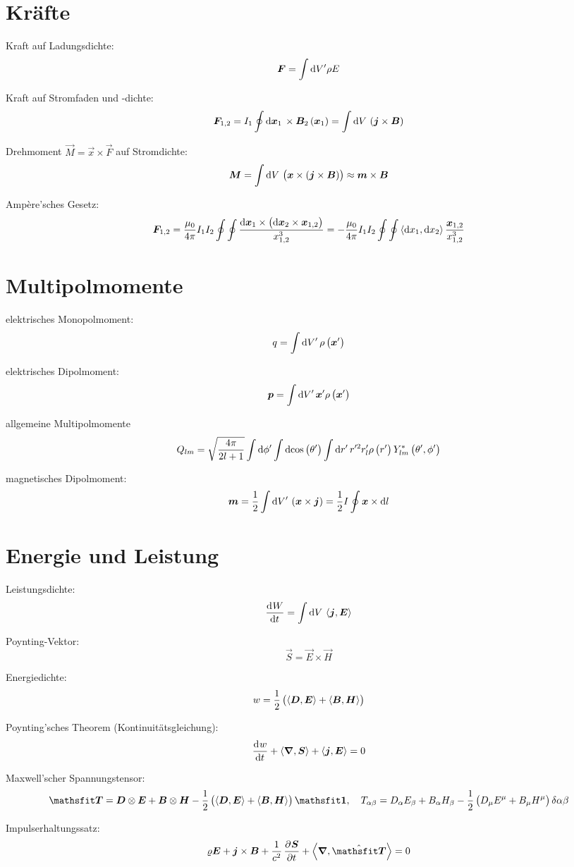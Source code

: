 \section{Kräfte}

Kraft auf Ladungsdichte:
\[
	\vec F
	= \int \dif{V'} \rho E
\]

Kraft auf Stromfaden und -dichte:
\[
	\vec F_{1,2}
	= I_1 \oint \dif{\vec x_1} \, \times \vec B_2\del{\vec x_1}
	= \int \dif{V} \, \del{\vec j \times \vec B}
\]

Drehmoment $\vec M = \vec x \times \vec F$ auf Stromdichte:
\[
	\vec M
	= \int \dif{V} \, \del{\vec x \times \del{\vec j \times \vec B}}
	\approx \vec m \times \vec B
\]

Ampère'sches Gesetz:
\[
	\vec F_{1,2}
	= \frac{\mu_0}{4 \pi} I_1 I_2 \oint \oint \frac{\dif \vec x_1 \times \del{\dif \vec x_2 \times \vec x_{1,2}}}{x_{1,2}^3}
	= - \frac{\mu_0}{4 \pi} I_1 I_2 \oint \oint \inner{\dif x_1}{\dif x_2} \frac{\vec x_{1,2}}{x_{1,2}^3}
\]

\section{Multipolmomente}

elektrisches Monopolmoment:
\[
	q
	= \int \dif{V'} \, \rho\del{\vec x'}
\]

elektrisches Dipolmoment:
\[
	\vec p
	= \int \dif{V'} \, \vec x' \rho\del{\vec x'}
\]

allgemeine Multipolmomente
\[
	Q_{lm}
	=
	\sqrt{\frac{4\pi}{2l+1}}
	\int \dif{\phi'}
	\int \dif{\cos\del{\theta'}}
	\int \dif{r'}
	\,
	r'^2 r'_l \rho\del{r'}
	Y^*_{lm} \del{\theta', \phi'}
\]

magnetisches Dipolmoment:
\[
	\vec m
	= \half \int \dif{V'} \, \del{\vec x \times \vec j}
	= \half I \oint \vec x \times \dif l
\]

\section{Energie und Leistung}

Leistungsdichte:
\[
	\dod Wt = \int \dif V \, \inner{\vec j}{\vec E}
\]

Poynting-Vektor:
\[
	\vec S = \vec E \times \vec H
\]

Energiedichte:
\[
	w = \half \del{\inner{\vec D}{\vec E} + \inner{\vec B}{\vec H}}
\]

Poynting'sches Theorem (Kontinuitätsgleichung):
\[
	\dod wt + \divergence{\vec S} + \inner{\vec j}{\vec E} = 0
\]

Maxwell'scher Spannungstensor:
\[
	\tens T
	= \vec D \otimes \vec E + \vec B \otimes \vec H
	- \half \del{\inner{\vec D}{\vec E} + \inner{\vec B}{\vec H}} \tens 1
	\eqnsep
	T_{\alpha\beta}
	= D_\alpha E_\beta + B_\alpha H_\beta - \half \del{D_\mu E^\mu + B_\mu H^\mu} \delta{\alpha\beta}
\]

Impulserhaltungssatz:
\[
	\varrho \vec E
	+ \vec j \times \vec B
	+ \frac1{c^2} \dpd{\vec S}t
	+ \divergence{\hat{\tens T}}
	= 0
\]

%	
%	



